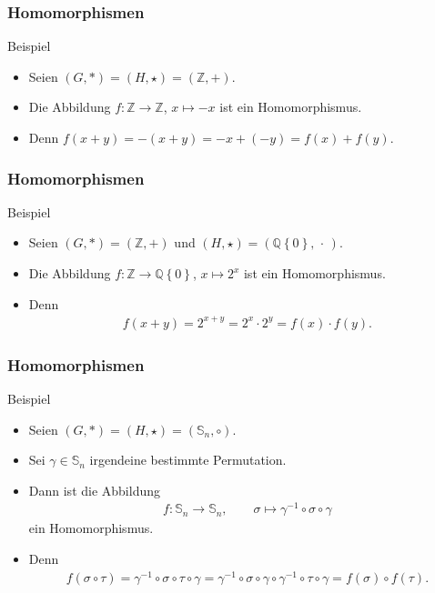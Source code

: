 \documentclass{beamer}
\newcommand\ZZ{\mathbb Z}
\newcommand\QQ{\mathbb Q}
\renewcommand\SS{\mathbb S}
\newcommand\cbc[1]{\left\{{#1}\right\}}
\begin{document}
\begin{frame}\frametitle{Homomorphismen}
	\begin{block}{Beispiel}
		\begin{itemize}
			\item Seien $(G,*)=(H,\star)=(\ZZ,+)$.
			\item Die Abbildung $f:\ZZ\to\ZZ$, $x\mapsto -x$ ist ein Homomorphismus.
			\item Denn $f(x+y)=-(x+y)=-x+(-y)=f(x)+f(y)$.
		\end{itemize}
	\end{block}
\end{frame}

\begin{frame}\frametitle{Homomorphismen}
	\begin{block}{Beispiel}
		\begin{itemize}
			\item Seien $(G,*)=(\ZZ,+)$ und $(H,\star)=(\QQ\cbc0,\,\cdot\,)$.
			\item Die Abbildung $f:\ZZ\to\QQ\cbc0$, $x\mapsto 2^x$ ist ein Homomorphismus.
			\item Denn 
				\begin{align*}
					f(x+y)=2^{x+y}=2^x\cdot 2^y=f(x)\cdot f(y).
				\end{align*}
		\end{itemize}
	\end{block}
\end{frame}

\begin{frame}\frametitle{Homomorphismen}
	\begin{block}{Beispiel}
		\begin{itemize}
			\item Seien $(G,*)=(H,\star)=(\SS_n,\circ)$.
			\item Sei $\gamma\in\SS_n$ irgendeine bestimmte Permutation.
			\item Dann ist die Abbildung
				\begin{align*}
					f:\SS_n\to\SS_n,\qquad \sigma\mapsto \gamma^{-1}\circ\sigma\circ\gamma
				\end{align*}
				ein Homomorphismus.
			\item Denn
				\begin{align*}
					f(\sigma\circ\tau)=\gamma^{-1}\circ\sigma\circ\tau\circ\gamma=\gamma^{-1}\circ\sigma\circ\gamma\circ\gamma^{-1}\circ\tau\circ\gamma=f(\sigma)\circ f(\tau).
				\end{align*}
		\end{itemize}
	\end{block}
\end{frame}
\end{document}
